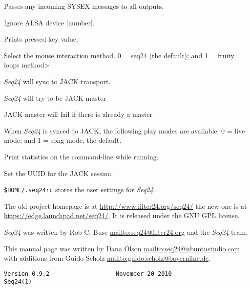       Passes any incoming SYSEX messages to all outputs.

      Ignore ALSA device [number].

      Prints pressed key value.

      Select the mouse interaction method.
      0 = seq24 (the default); and 1 = fruity loops method>

      \textsl{Seq24} will sync to JACK transport.

      \textsl{Seq24} will try to be JACK master

      JACK master will fail if there is already a master

      When \textsl{Seq24} is synced to JACK, the following play modes are
      available: 0 = live mode; and 1 = song mode, the default.

      Print statistics on the command-line while running.

      Set the UUID for the JACK session.

   \texttt{\$HOME/.seq24rc} stores the user settings for \textsl{Seq24}.

   The old project homepage is at
   \url{http://www.filter24.org/seq24/} the new
   one is at \url{https://edge.launchpad.net/seq24/}.
   It is released under the GNU GPL license.

   \textsl{Seq24} was written by Rob C. Buse \url{mailto:seq24@filter24.org}
   and the \textsl{Seq24} team.

   This manual page was written by Dana Olson
   \url{mailto:seq24@ubuntustudio.com} with additions from Guido Scholz
   \url{mailto:guido.scholz@bayernline.de}.

   \begin{verbatim}
Version 0.9.2                   November 20 2010                       Seq24(1)
   \end{verbatim}

